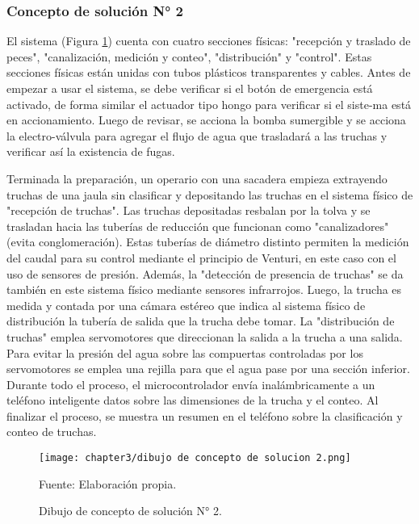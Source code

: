 \subsubsection{Concepto de solución N° 2}

El sistema (Figura \ref{fig:dibujo de concepto de solucion 2}) cuenta con cuatro secciones físicas: "recepción y traslado de peces", "canalización, medición y conteo", "distribución" y "control". Estas secciones físicas están unidas con tubos plásticos transparentes y cables. Antes de empezar a usar el sistema, se debe verificar si el botón de emergencia está activado, de forma similar el actuador tipo hongo para verificar si el siste-ma está en accionamiento. Luego de revisar, se acciona la bomba sumergible y se acciona la electro-válvula para agregar el flujo de agua que trasladará a las truchas y verificar así la existencia de fugas.

Terminada la preparación, un operario con una sacadera empieza extrayendo truchas de una jaula sin clasificar y depositando las truchas en el sistema físico de "recepción de truchas". Las truchas depositadas resbalan por la tolva y se trasladan hacia las tuberías de reducción que funcionan como "canalizadores" (evita conglomeración). Estas tuberías de diámetro distinto permiten la medición del caudal para su control mediante el principio de Venturi, en este caso con el uso de sensores de presión. Además, la "detección de presencia de truchas" se da también en este sistema físico mediante sensores infrarrojos. Luego, la trucha es medida y contada por una cámara estéreo que indica al sistema físico de distribución la tubería de salida que la trucha debe tomar. La "distribución de truchas" emplea servomotores que direccionan la salida a la trucha a una salida. Para evitar la presión del agua sobre las compuertas controladas por los servomotores se emplea una rejilla para que el agua pase por una sección inferior. 
Durante todo el proceso, el microcontrolador envía inalámbricamente a un teléfono inteligente datos sobre las dimensiones de la trucha y el conteo. Al finalizar el proceso, se muestra un resumen en el teléfono sobre la clasificación y conteo de truchas.

\begin{figure}[H]
	\centering
	\texttt{[image: chapter3/dibujo de concepto de solucion 2.png]}
	\caption{Dibujo de concepto de solución N° 2.}
	\begin{myflushleftportland}
		Fuente: Elaboración propia.
	\end{myflushleftportland}
	\label{fig:dibujo de concepto de solucion 2}
\end{figure}

